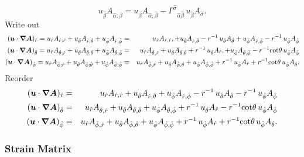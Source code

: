 \documentclass[\mydriver,12pt,twoside,notitlepage,a4paper]{article}
\renewcommand{\vec}[1]{\mbox{\boldmath{$#1$}}}
\newcommand{\Av}            {\vec{A}}
\newcommand{\uv}            {\vec{u}}
\newcommand{\nab}{\mbox{\boldmath $\nabla$} {}}
\begin{document}
\begin{equation}
u_{\hat\beta} A_{\hat\alpha;\hat\beta}=u_{\hat\beta} A_{\hat\alpha,\hat\beta}
-{\Gamma^{\hat\sigma}}_{\hat\alpha\hat\beta}\,u_{\hat\beta} A_{\hat\sigma}.
\end{equation}
Write out
\begin{eqnarray}
(\uv\cdot\nab\Av)_{\hat r}=
u_{\hat r}A_{\hat r;\hat r}
+u_{\hat\theta}A_{\hat r;\hat\theta}
+u_{\hat\phi}A_{\hat r;\hat\phi}
&=&u_{\hat r}A_{\hat r,\hat r},
+u_{\hat\theta}A_{\hat r,\hat\theta}-r^{-1}\,u_{\hat\theta}A_{\hat\theta}
+u_{\hat\phi}A_{\hat r,\hat\phi}-r^{-1}\,u_{\hat\phi}A_{\hat\phi}
\cr
(\uv\cdot\nab\Av)_{\hat\theta}=
u_{\hat r}A_{\hat\theta;\hat r}
+u_{\hat\theta}A_{\hat\theta;\hat\theta}
+u_{\hat\phi}A_{\hat\theta;\hat\phi}
&=&u_{\hat r}A_{\hat\theta,\hat r}
+u_{\hat\theta}A_{\hat\theta,\hat\theta}+r^{-1}\,u_{\hat\theta}A_{\hat r},
+u_{\hat\phi}A_{\hat\theta,\hat\phi}-r^{-1}\!\cot\!\theta\,u_{\hat\phi}A_{\hat\phi}
\cr
(\uv\cdot\nab\Av)_{\hat\phi}=
u_{\hat r}A_{\hat\phi;\hat r}
+u_{\hat\theta}A_{\hat\phi;\hat\theta}
+u_{\hat\phi}A_{\hat\phi;\hat\phi}
&=&u_{\hat r}A_{\hat\phi,\hat r}
+u_{\hat\theta}A_{\hat\phi,\hat\theta}
+u_{\hat\phi}A_{\hat\phi,\hat\phi}+r^{-1}\,u_{\hat\phi}A_{\hat r}+r^{-1}\!\cot\!\theta\,u_{\hat\phi}A_{\hat\theta}.
\nonumber
\end{eqnarray}
Reorder
\begin{eqnarray}
(\uv\cdot\nab\Av)_{\hat r}
&=&u_{\hat r}A_{\hat r,\hat r}+u_{\hat\theta}A_{\hat r,\hat\theta}+u_{\hat\phi}A_{\hat r,\hat\phi}
-r^{-1}\,u_{\hat\theta}A_{\hat\theta}-r^{-1}\,u_{\hat\phi}A_{\hat\phi}
\cr
(\uv\cdot\nab\Av)_{\hat\theta}
&=&u_{\hat r}A_{\hat\theta,\hat r}+u_{\hat\theta}A_{\hat\theta,\hat\theta}+u_{\hat\phi}A_{\hat\theta,\hat\phi}
+r^{-1}\,u_{\hat\theta}A_{\hat r}-r^{-1}\!\cot\!\theta\,u_{\hat\phi}A_{\hat\phi}
\cr
(\uv\cdot\nab\Av)_{\hat\phi}
&=&u_{\hat r}A_{\hat\phi,\hat r}+u_{\hat\theta}A_{\hat\phi,\hat\theta}+u_{\hat\phi}A_{\hat\phi,\hat\phi}
+r^{-1}\,u_{\hat\phi}A_{\hat r}+r^{-1}\!\cot\!\theta\,u_{\hat\phi}A_{\hat\theta}.
\end{eqnarray}

\subsubsection{Strain Matrix}
\end{document}
